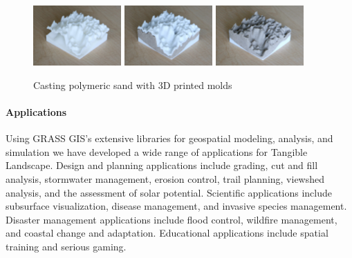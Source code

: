 \documentclass[prodmode,acmtochi]{acmsmall} %
\begin{document}
\begin{figure}[h!]
\begin{center}
		\includegraphics[width=0.3\textwidth]{images/3d_print_1.jpg}
		\includegraphics[width=0.3\textwidth]{images/3d_print_2.jpg}
		\includegraphics[width=0.3\textwidth]{images/3d_print_3.jpg}
	\caption{Casting polymeric sand with 3D printed molds}
	\label{fig:casting}
\end{center}
\end{figure}


\paragraph{Applications}
Using GRASS GIS's extensive libraries for geospatial modeling, analysis, and simulation 
we have developed a wide range of applications for Tangible Landscape.
%
Design and planning applications include
grading, cut and fill analysis, stormwater management, erosion control, 
trail planning, viewshed analysis, and the assessment of solar potential. 
%
Scientific applications include
subsurface visualization, disease management, and invasive species management.
%
Disaster management applications include 
flood control, wildfire management, and coastal change and adaptation. 
%
Educational applications include
spatial training and serious gaming.
\end{document}
